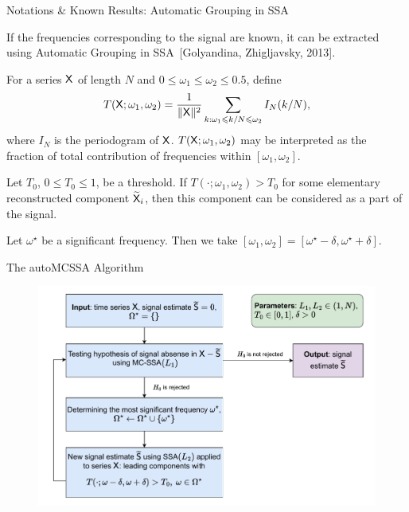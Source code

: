 \documentclass[notheorems, handout]{beamer}
\begin{document}
\begin{frame}{Notations \& Known Results: Automatic Grouping in SSA}

	If the frequencies corresponding to the signal are known, it can be extracted using Automatic Grouping in SSA~[Golyandina, Zhigljavsky, 2013].\medskip

	For a series $\mathsf{X}$ of length $N$ and $0\leqslant\omega_1\leqslant\omega_2\leqslant0.5$, define
	$$
		T(\mathsf{X}; \omega_1,\omega_2)=\frac{1}{\|\mathsf{X}\|^2}\sum_{k:\omega_1\leqslant k / N \leqslant \omega_2}I_N(k / N),
	$$
	where $I_N$ is the periodogram of $\mathsf{X}$. $T(\mathsf{X}; \omega_1, \omega_2)$ may be interpreted as the fraction of total contribution of frequencies within $[\omega_1, \omega_2]$.\medskip
	
	Let $T_0$, $0\leqslant T_0\leqslant1$, be a threshold. If $T(\cdot; \omega_1,\omega_2)>T_0$ for some elementary reconstructed component $\widetilde {\mathsf{X}}_i$, then this component can be considered as a part of the signal. \bigskip

	Let $\omega^\star$ be a significant frequency. Then we take $[\omega_1, \omega_2]=[\omega^\star-\delta, \omega^\star + \delta]$.
\end{frame}

\begin{frame}{The autoMCSSA Algorithm}
	\begin{figure}
		\centering
		\includegraphics[width=\textwidth]{../paper/img/auto_mcssa_alg.pdf}
	\end{figure}
\end{frame}
\end{document}
